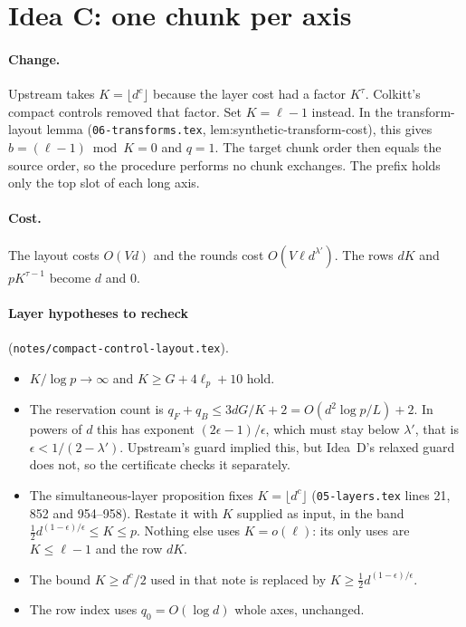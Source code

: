 \documentclass[11pt]{article}
\theoremstyle{remark}\newtheorem*{remark}{Remark}
\begin{document}
\section{Idea C: one chunk per axis}

\paragraph{Change.} Upstream takes $K=\lfloor d^c\rfloor$ because the layer cost had a factor
$K^\tau$. Colkitt's compact controls removed that factor. Set $K=\ell-1$ instead. In the
transform-layout lemma (\texttt{06-transforms.tex}, lem:synthetic-transform-cost), this gives
$b=(\ell-1)\bmod K=0$ and $q=1$. The target chunk order then equals the source order, so the
procedure performs no chunk exchanges. The prefix holds only the top slot of each long axis.

\paragraph{Cost.} The layout costs $O(V d)$ and the rounds cost
$O(V\ell d^{\lambda'})$. The rows $dK$ and $pK^{\tau-1}$ become $d$ and $0$.

\paragraph{Layer hypotheses to recheck} (\texttt{notes/compact-control-layout.tex}).
\begin{itemize}
\item $K/\log p\to\infty$ and $K\ge G+4\ell_p+10$ hold.
\item The reservation count is $q_F+q_B\le3dG/K+2=O(d^2\log p/L)+2$. In powers of $d$ this has
exponent $(2\epsilon-1)/\epsilon$, which must stay below $\lambda'$, that is $\epsilon<1/(2-\lambda')$. Upstream's guard implied this, but Idea~D's relaxed guard does not, so the certificate checks it separately.
\item The simultaneous-layer proposition fixes $K=\lfloor d^c\rfloor$ (\texttt{05-layers.tex} lines 21, 852 and 954--958). Restate it with $K$ supplied as input, in the band $\tfrac12d^{(1-\epsilon)/\epsilon}\le K\le p$. Nothing else uses $K=o(\ell)$: its only uses are $K\le\ell-1$ and the row $dK$.
\item The bound $K\ge d^c/2$ used in that note is replaced by $K\ge\tfrac12d^{(1-\epsilon)/\epsilon}$.
\item The row index uses $q_0=O(\log d)$ whole axes, unchanged.
\end{itemize}
\end{document}
